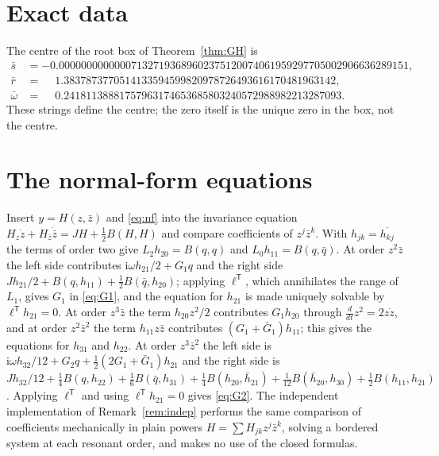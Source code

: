 \documentclass[11pt,a4paper]{article}
\theoremstyle{plain}
\theoremstyle{definition}
\theoremstyle{remark}
\newcommand{\ii}{\mathrm i}
\newcommand{\T}{\mathsf T}
\begin{document}
\appendix

\section{Exact data}\label{app:data}
\begin{table}[ht]
\centering\small

\caption{Exact decimal data of the generalized Hopf patch \eqref{eq:patch}.}
\label{tab:patch}
\end{table}

\begin{table}[ht]
\centering\small

\caption{Exact dyadic equilibrium, currents and reverse ratio of the finite witness. The other five reverse ratios are $1/100$; rates follow from \eqref{eq:rates} and totals from \eqref{eq:totals}.}
\label{tab:dyadic}
\end{table}

The centre of the root box of Theorem~\ref{thm:GH} is
{\small
\begin{align*}
\bar s&=-0.000000000000071327193689602375120074061959297705002906636289151,\\
\bar r&=\phantom{-}1.3837873770514133594599820978726493616170481963142,\\
\bar\omega&=\phantom{-}0.24181138881757963174653685803240572988982213287093 .
\end{align*}}%
These strings define the centre; the zero itself is the unique zero in the box, not the centre.

\section{The normal-form equations}\label{app:nf}
Insert $y=H(z,\bar z)$ and \eqref{eq:nf} into the invariance equation $H_z\dot z+H_{\bar z}\dot{\bar z}=JH+\frac12B(H,H)$ and compare coefficients of $z^j\bar z^k$. With $h_{jk}=\overline{h_{kj}}$ the terms of order two give $L_2h_{20}=B(q,q)$ and $L_0h_{11}=B(q,\bar q)$. At order $z^2\bar z$ the left side contributes $\ii\omega h_{21}/2+G_1q$ and the right side $Jh_{21}/2+B(q,h_{11})+\frac12B(\bar q,h_{20})$; applying $\ell^\T$, which annihilates the range of $L_1$, gives $G_1$ in \eqref{eq:G1}, and the equation for $h_{21}$ is made uniquely solvable by $\ell^\T h_{21}=0$. At order $z^3\bar z$ the term $h_{20}z^2/2$ contributes $G_1h_{20}$ through $\frac{d}{dt}z^2=2z\dot z$, and at order $z^2\bar z^2$ the term $h_{11}z\bar z$ contributes $(G_1+\bar G_1)h_{11}$; this gives the equations for $h_{31}$ and $h_{22}$. At order $z^3\bar z^2$ the left side is $\ii\omega h_{32}/12+G_2q+\frac12(2G_1+\bar G_1)h_{21}$ and the right side is $Jh_{32}/12+\frac14B(q,h_{22})+\frac16B(\bar q,h_{31})+\frac14B(h_{20},\bar h_{21})+\frac1{12}B(\bar h_{20},h_{30})+\frac12B(h_{11},h_{21})$. Applying $\ell^\T$ and using $\ell^\T h_{21}=0$ gives \eqref{eq:G2}. The independent implementation of Remark~\ref{rem:indep} performs the same comparison of coefficients mechanically in plain powers $H=\sum H_{jk}z^j\bar z^k$, solving a bordered system at each resonant order, and makes no use of the closed formulas.
\end{document}
